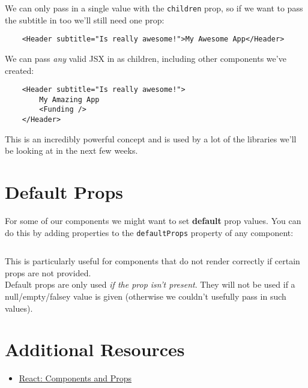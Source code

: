 We can only pass in a single value with the \texttt{children} prop, so if we want to pass the subtitle in too we'll still need one prop:

\begin{verbatim}
    <Header subtitle="Is really awesome!">My Awesome App</Header>
\end{verbatim}

We can pass \textit{any} valid JSX in as children, including other components we've created:

\begin{verbatim}
    <Header subtitle="Is really awesome!">
        My Amazing App
        <Funding />
    </Header>
\end{verbatim}

This is an incredibly powerful concept and is used by a lot of the libraries we'll be looking at in the next few weeks.


\pagebreak


\section{Default Props}


For some of our components we might want to set \textbf{default} prop values. You can do this by adding properties to the \texttt{defaultProps} property of any component:

\inputminted{jsx}{03-props/figures/09-default-props.jsx}

This is particularly useful for components that do not render correctly if certain props are not provided.
\\

Default props are only used \textit{if the prop isn't present}. They will not be used if a null/empty/falsey value is given (otherwise we couldn't usefully pass in such values).


\section{Additional Resources}

\begin{itemize}[leftmargin=*]
    \item \href{https://reactjs.org/docs/components-and-props.html}{React: Components and Props}
\end{itemize}
